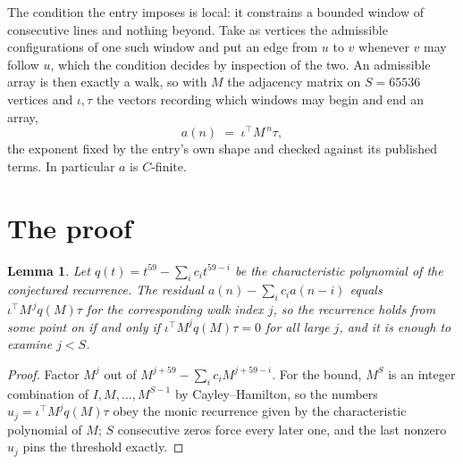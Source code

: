 \documentclass[11pt,a4paper]{article}
\theoremstyle{plain}
\newtheorem{lemma}[theorem]{Lemma}
\theoremstyle{definition}
\begin{document}
The condition the entry imposes is local: it constrains a bounded window of consecutive lines and nothing beyond. Take as
vertices the admissible configurations of one such window and put an edge from $u$ to $v$
whenever $v$ may follow $u$, which the condition decides by inspection of the two. An
admissible array is then exactly a walk, so with $M$ the adjacency matrix on $S=65536$ vertices
and $\iota,\tau$ the vectors recording which windows may begin and end an array,
\[
a(n)\;=\;\iota^{\!\top}M^{\,n}\tau ,
\]
the exponent fixed by the entry's own shape and checked against its published terms. In
particular $a$ is $C$-finite.

\section{The proof}

\begin{lemma}\label{lem:crit}
Let $q(t)=t^{59}-\sum_i c_it^{59-i}$ be the characteristic polynomial of the
conjectured recurrence. The residual $a(n)-\sum_ic_ia(n-i)$ equals
$\iota^{\!\top}M^{\,j}q(M)\tau$ for the corresponding walk index $j$, so the recurrence
holds from some point on if and only if $\iota^{\!\top}M^{j}q(M)\tau=0$ for all large $j$,
and it is enough to examine $j<S$.
\end{lemma}

\begin{proof}
Factor $M^{j}$ out of $M^{j+59}-\sum_ic_iM^{j+59-i}$. For the bound, $M^{S}$
is an integer combination of $I,M,\dots,M^{S-1}$ by Cayley--Hamilton, so the numbers
$u_j=\iota^{\!\top}M^{j}q(M)\tau$ obey the monic recurrence given by the characteristic
polynomial of $M$; $S$ consecutive zeros force every later one, and the last nonzero $u_j$
pins the threshold exactly.
\end{proof}
\end{document}
